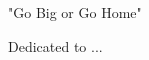 
\cleardoublepage
{}
\thispagestyle{empty}

\vspace*{3cm}

\begin{center}
   "Go Big or Go Home" \medskip
\end{center}

\medskip

\begin{center}
    Dedicated to ...
\end{center}
